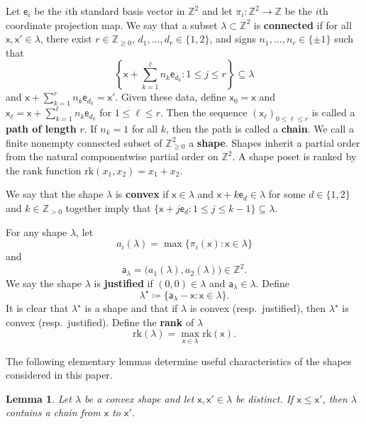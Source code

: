 \documentclass[12pt]{amsart}
\newcommand{\x}{\ensuremath{\mathsf{x}}}
\newcommand{\e}{\ensuremath{\mathsf{e}}}
\newcommand{\aaa}{\ensuremath{\mathsf{a}}}
\newtheorem{lemma}[theorem]{Lemma}
\theoremstyle{definition}
\theoremstyle{remark}
\numberwithin{equation}{section}
\newcommand{\rank}{\ensuremath{\mathrm{rk}}}
\begin{document}
Let $\e_i$ be the $i$th standard basis vector in $\mathbb{Z}^{2}$ and let $\pi_i : \mathbb{Z}^{2} \to \mathbb{Z}$ be the $i$th coordinate projection map. We say that a subset $\lambda \subset \mathbb{Z}^{2}$ is {\bf connected} if for all $\x,\x' \in \lambda$, there exist $r \in \mathbb{Z}_{\geq 0}$, $d_1,...,d_r \in \{1, 2 \}$, and signs $n_1,...,n_r \in \{ \pm 1 \}$ such that 
\[\left\{ \x + \sum_{k=1}^\ell n_k \e_{d_k} :  1\leq j \leq r \right\} \subseteq \lambda\]
 and $\x + \sum_{k=1}^r n_k \e_{d_k} = \x'$. Given these data, define $\x_0 = \x$ and $\x_\ell = \x + \sum_{k=1}^\ell n_k \e_{d_k}$ for $1 \leq \ell \leq r$. Then the sequence $\left( \x_\ell  \right)_{0 \leq \ell \leq r}$ is called a {\bf path of length} $r$. If $n_k = 1$ for all $k$, then the path is called a {\bf chain}. We call a finite nonempty connected subset of $\mathbb{Z}_{\geq 0}^2$ a {\bf shape}.  Shapes inherit a partial order from the natural componentwise partial order on $\mathbb{Z}^2$. A shape poset is ranked by the rank function $\text{rk}(x_1,x_2) = x_1 + x_2$.

We say that the shape $\lambda$ is {\bf convex} if $\x\in \lambda$ and $\x + k  \e_d \in \lambda $ for some $d \in \{1, 2\}$ and $k \in \mathbb{Z}_{> 0}$ together imply  that $\{\x + j \e_d : 1 \leq j \leq k-1 \} \subseteq \lambda.$

For any shape $\lambda$, let \[a_i(\lambda) = \max \{ \pi_i(\x) \colon \x \in \lambda\}\] and \[\aaa_\lambda = \big(a_1(\lambda),a_{2}(\lambda)\big) \in \mathbb{Z}^2.\] We say the shape $\lambda$ is {\bf justified} if $(0,0) \in \lambda$ and $\aaa_{\lambda} \in \lambda$. Define 
\[
\lambda^\star \coloneqq \lbrace \aaa_\lambda - \x: \x \in \lambda \rbrace.
\] It is clear that $\lambda^{\star}$ is a shape and that if $\lambda$ is convex (resp.\ justified), then $\lambda^\star$ is convex (resp.\ justified).  Define the {\bf rank} of $\lambda$ 
\[ 
\rank(\lambda) = \max_{\x \in \lambda} \rank(\x).
\]

The following elementary lemmas determine useful characteristics of the shapes considered in this paper. 

\begin{lemma} \label{lem:convex_chain}
Let $\lambda$ be a convex shape and let $\x,\x' \in \lambda$ be distinct. If $\x \leq \x'$, then $\lambda$ contains a chain from $\x$ to $\x'$. 
\end{lemma}
\end{document}
